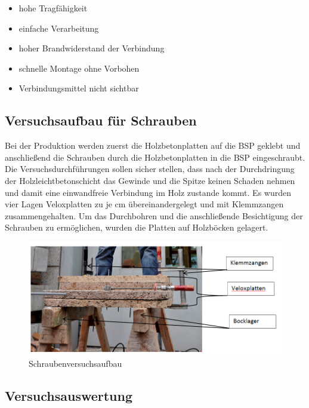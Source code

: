 \begin{itemize}
	\item hohe Tragfähigkeit
	\item einfache Verarbeitung
	\item hoher Brandwiderstand der Verbindung
	\item schnelle Montage ohne Vorbohen
	\item Verbindungsmittel nicht sichtbar
\end{itemize}

\subsection{Versuchsaufbau für Schrauben}

Bei der Produktion werden zuerst die Holzbetonplatten auf die BSP geklebt und anschließend die Schrauben durch die Holzbetonplatten in die BSP eingeschraubt. Die Versuchsdurchführungen sollen sicher stellen, dass nach der Durchdringung der Holzleichtbetonschicht das Gewinde und die Spitze keinen Schaden nehmen und damit eine einwandfreie Verbindung im Holz zustande kommt. \newline Es wurden vier Lagen Veloxplatten zu je \unit[5]{cm} übereinandergelegt und mit Klemmzangen zusammengehalten. Um das Durchbohren und die anschließende Besichtigung der Schrauben zu ermöglichen, wurden die Platten auf Holzböcken gelagert.  

\begin{figure}
\begin{center}
\includegraphics[scale =0.6]{Verbindungsmittel/schrauben/Schraubenversuchsaufbau.png}
\caption{ Schraubenversuchsaufbau}
\end{center}
\end{figure}

\subsection{Versuchsauswertung}

